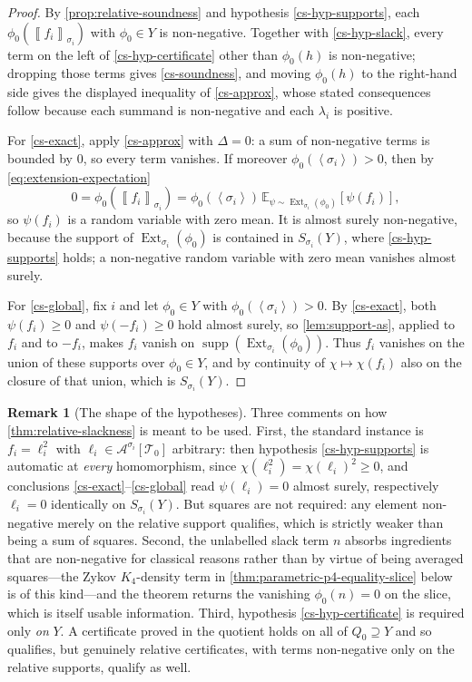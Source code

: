 \documentclass[11pt]{article}
\theoremstyle{definition}
\newtheorem{remark}[remark]{Remark}
\newcommand{\E}{\mathbb{E}}
\newcommand{\A}{\mathcal{A}}
\newcommand{\T}{\mathcal{T}}
\newcommand{\Ext}{\operatorname{Ext}}
\newcommand{\supp}{\operatorname{supp}}
\newcommand{\brak}[1]{\left\langle #1\right\rangle}
\newcommand{\avg}[2]{\left\llbracket #1 \right\rrbracket_{#2}}
\begin{document}
\begin{proof}
By \cref{prop:relative-soundness} and hypothesis \ref{cs-hyp-supports}, each
$\phi_0(\avg{f_i}{\sigma_i})$ with $\phi_0\in Y$ is non-negative.  Together with
\ref{cs-hyp-slack}, every term on the left of \ref{cs-hyp-certificate} other than
$\phi_0(h)$ is non-negative; dropping those terms gives \ref{cs-soundness}, and moving
$\phi_0(h)$ to the right-hand side gives the displayed inequality of \ref{cs-approx},
whose stated consequences follow because each summand is non-negative and each
$\lambda_i$ is positive.

For \ref{cs-exact}, apply \ref{cs-approx} with $\Delta=0$: a sum of non-negative terms is
bounded by $0$, so every term vanishes.  If moreover $\phi_0(\brak{\sigma_i})>0$, then by
\eqref{eq:extension-expectation}
\[
  0=\phi_0(\avg{f_i}{\sigma_i})
  =\phi_0(\brak{\sigma_i})\,\E_{\psi\sim\Ext_{\sigma_i}(\phi_0)}[\psi(f_i)],
\]
so $\psi(f_i)$ is a random variable with zero mean.  It is almost surely non-negative,
because the support of $\Ext_{\sigma_i}(\phi_0)$ is contained in $S_{\sigma_i}(Y)$, where
\ref{cs-hyp-supports} holds; a non-negative random variable with zero mean vanishes
almost surely.

For \ref{cs-global}, fix $i$ and let $\phi_0\in Y$ with $\phi_0(\brak{\sigma_i})>0$.  By
\ref{cs-exact}, both $\psi(f_i)\ge0$ and $\psi(-f_i)\ge0$ hold almost surely, so
\cref{lem:support-as}, applied to $f_i$ and to $-f_i$, makes $f_i$ vanish on
$\supp(\Ext_{\sigma_i}(\phi_0))$.  Thus $f_i$ vanishes on the union of these supports
over $\phi_0\in Y$, and by continuity of $\chi\mapsto\chi(f_i)$ also on the closure of
that union, which is $S_{\sigma_i}(Y)$.
\end{proof}

\begin{remark}[The shape of the hypotheses]\label{rem:cs-shape}
Three comments on how \cref{thm:relative-slackness} is meant to be used.  First, the
standard instance is $f_i=\ell_i^2$ with $\ell_i\in\A^{\sigma_i}[\T_0]$ arbitrary: then
hypothesis \ref{cs-hyp-supports} is automatic at \emph{every} homomorphism, since
$\chi(\ell_i^2)=\chi(\ell_i)^2\ge0$, and conclusions
\ref{cs-exact}--\ref{cs-global} read $\psi(\ell_i)=0$ almost surely, respectively
$\ell_i=0$ identically on $S_{\sigma_i}(Y)$.  But squares are not required: any element
non-negative merely on the relative support qualifies, which is strictly weaker than
being a sum of squares.  Second, the unlabelled slack term $n$ absorbs ingredients that
are non-negative for classical reasons rather than by virtue of being averaged
squares---the Zykov $K_4$-density term in \cref{thm:parametric-p4-equality-slice} below
is of this kind---and the theorem returns the vanishing $\phi_0(n)=0$ on the slice,
which is itself usable information.  Third, hypothesis \ref{cs-hyp-certificate} is
required only \emph{on} $Y$.  A certificate proved in the quotient holds on all of
$Q_0\supseteq Y$ and so qualifies, but genuinely relative certificates, with terms
non-negative only on the relative supports, qualify as well.
\end{remark}
\end{document}
